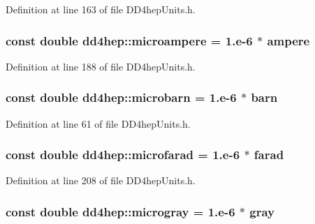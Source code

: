 Definition at line 163 of file DD4hepUnits.h.\hypertarget{namespacedd4hep_a1f84b64efe21c2df40a7816c4918e803}{
\subsubsection[{microampere}]{\setlength{\rightskip}{0pt plus 5cm}const double {\bf dd4hep::microampere} = 1.e-\/6 $\ast$ {\bf ampere}}}
\label{namespacedd4hep_a1f84b64efe21c2df40a7816c4918e803}


Definition at line 188 of file DD4hepUnits.h.\hypertarget{namespacedd4hep_a6547f374ef4d563258406069e1b659e0}{
\subsubsection[{microbarn}]{\setlength{\rightskip}{0pt plus 5cm}const double {\bf dd4hep::microbarn} = 1.e-\/6 $\ast$ {\bf barn}}}
\label{namespacedd4hep_a6547f374ef4d563258406069e1b659e0}


Definition at line 61 of file DD4hepUnits.h.\hypertarget{namespacedd4hep_ac0a29619dce85531e693e16f0baf27d8}{
\subsubsection[{microfarad}]{\setlength{\rightskip}{0pt plus 5cm}const double {\bf dd4hep::microfarad} = 1.e-\/6 $\ast$ {\bf farad}}}
\label{namespacedd4hep_ac0a29619dce85531e693e16f0baf27d8}


Definition at line 208 of file DD4hepUnits.h.\hypertarget{namespacedd4hep_a3d5d57424aedb6753f4c4a9ad998b722}{
\subsubsection[{microgray}]{\setlength{\rightskip}{0pt plus 5cm}const double {\bf dd4hep::microgray} = 1.e-\/6 $\ast$ {\bf gray}}}
\label{namespacedd4hep_a3d5d57424aedb6753f4c4a9ad998b722}


